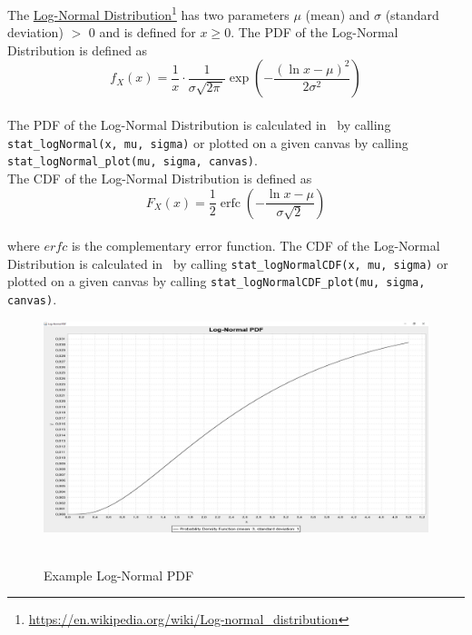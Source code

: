 		The \href{https://en.wikipedia.org/wiki/Log-normal_distribution}{Log-Normal Distribution}\footnote{\url{https://en.wikipedia.org/wiki/Log-normal_distribution}} has two parameters $\mu$ (mean) and $\sigma$ (standard deviation) $>$ 0 and is defined for $x \geq 0$. The \ac{PDF} of the Log-Normal Distribution is defined as
		\\[0.3cm]
		$$f_X(x) = \frac 1 x \cdot \frac 1 {\sigma\sqrt{2\pi\,}} \exp\left( -\frac{(\ln x-\mu)^2}{2\sigma^2} \right)$$
		\\[0.3cm]
		The \ac{PDF} of the Log-Normal Distribution is calculated in \setlx\ by calling \lstinline{stat_logNormal(x, mu, sigma)} or plotted on a given canvas by calling \lstinline{stat_logNormal_plot(mu, sigma, canvas)}.
		\\[0.3cm]
		The \ac{CDF} of the Log-Normal Distribution is defined as
		\\[0.3cm]
		$$F_X(x) = \frac12 \operatorname{erfc} \left(-\frac{\ln x - \mu}{\sigma\sqrt{2}}\right)$$
		\\[0.3cm]
		where $erfc$ is the complementary error function.
		The \ac{CDF} of the Log-Normal Distribution is calculated in \setlx\ by calling \lstinline{stat_logNormalCDF(x, mu, sigma)} or plotted on a given canvas by calling \lstinline{stat_logNormalCDF_plot(mu, sigma, canvas)}.

		\begin{figure}[H]
			\centering
			\includegraphics[width=1\textwidth]{Figures/implemented_functions/log_normal_pdf}~\\
			\caption{Example Log-Normal PDF}
			\label{fig:log_normal_pdf}
		\end{figure}


